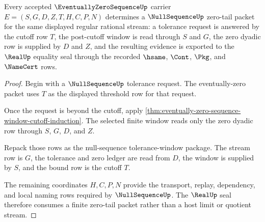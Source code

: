 \begin{theorem}
\label{thm:eventually-zero-sequence-nullsequence-handoff}
Every accepted $\EventuallyZeroSequenceUp$ carrier $E=(S,G,D,Z,T,H,C,P,N)$ determines a $\NullSequenceUp$ zero-tail packet for the same displayed regular rational stream: a tolerance request is answered by the cutoff row $T$, the post-cutoff window is read through $S$ and $G$, the zero dyadic row is supplied by $D$ and $Z$, and the resulting evidence is exported to the $\RealUp$ equality seal through the recorded $\hsame$, $\Cont$, $\Pkg$, and $\NameCert$ rows.
\end{theorem}
\begin{proof}
Begin with a $\NullSequenceUp$ tolerance request. The eventually-zero packet uses $T$ as the displayed threshold row for that request.

Once the request is beyond the cutoff, apply \autoref{thm:eventually-zero-sequence-window-cutoff-induction}. The selected finite window reads only the zero dyadic row through $S$, $G$, $D$, and $Z$.

Repack those rows as the null-sequence tolerance-window package. The stream row is $G$, the tolerance and zero ledger are read from $D$, the window is supplied by $S$, and the bound row is the cutoff $T$.

The remaining coordinates $H,C,P,N$ provide the transport, replay, dependency, and local naming rows required by $\NullSequenceUp$. The $\RealUp$ seal therefore consumes a finite zero-tail packet rather than a host limit or quotient stream.
\end{proof}

